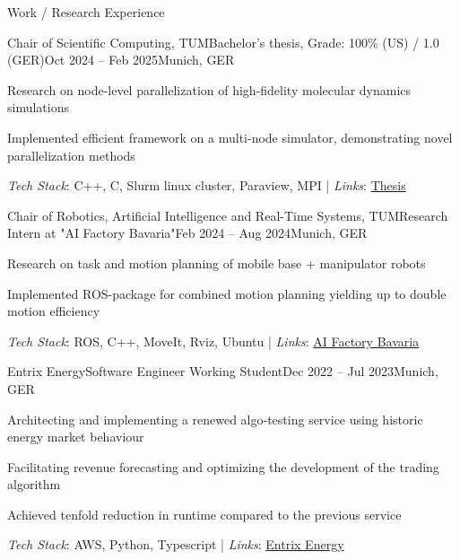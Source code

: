 \documentclass{kyvernitis-resume}
\begin{document}
\begin{section}{Work / Research Experience}

    \begin{subsection}{Chair of Scientific Computing, TUM}{Bachelor's thesis, Grade: 100\% (US) / 1.0 (GER)}{Oct 2024 -- Feb 2025}{Munich, GER}
    \item{Research on node-level parallelization of high-fidelity molecular dynamics simulations}

    \item{Implemented efficient framework on a multi-node simulator, demonstrating novel parallelization methods} 
\end{subsection}
    \textit{Tech Stack}: C++, C, Slurm linux cluster, Paraview, MPI\hspace{0.1cm} | \hspace{0.1cm}
    \textit{Links}: \href{https://mediatum.ub.tum.de/1781358}{Thesis}
    

    \begin{subsection}{Chair of Robotics, Artificial Intelligence and Real-Time Systems, TUM}{Research Intern at "AI Factory Bavaria"}{Feb 2024 -- Aug 2024}{Munich, GER}
    \item Research on task and motion planning of mobile base + manipulator robots
    \item Implemented ROS-package for combined motion planning yielding up to double motion efficiency
    \end{subsection}
    \textit{Tech Stack}: ROS, C++, MoveIt, Rviz, Ubuntu\hspace{0.1cm} | \hspace{0.1cm}
    \textit{Links}: \href{https://kifabrik.mirmi.tum.de/}{AI Factory Bavaria}
    

    \begin{subsection}{Entrix Energy}{Software Engineer Working Student}{Dec 2022 -- Jul 2023}{Munich, GER}
        \item Architecting and implementing a renewed algo-testing service using historic energy market behaviour
        \item Facilitating revenue forecasting and optimizing the development of the trading algorithm
        \item Achieved tenfold reduction in runtime compared to the previous service
    \end{subsection}
    \textit{Tech Stack}: AWS, Python, Typescript \hspace{0.1cm} | \hspace{0.1cm}
    \textit{Links}: \href{https://www.entrixenergy.com/en/home/}{Entrix Energy}
    

\end{section}
\end{document}
